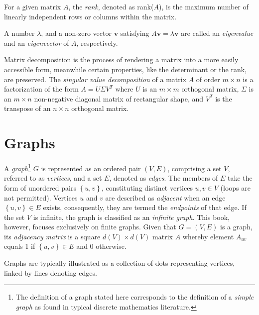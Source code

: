 For a given matrix $A$, the \emph{rank}, denoted as rank($A$), is the maximum number of linearly independent rows or columns within the matrix.

A number $\lambda$, and a non-zero vector $\mathbf{v}$ satisfying $A \mathbf{v} = \lambda \mathbf{v}$ are called an \emph{eigenvalue} and an \emph{eigenvector} of $A$, respectively.

Matrix decomposition is the process of rendering a matrix into a more easily accessible form, meanwhile certain properties, like the determinant or the rank, are preserved. The \emph{singular value decomposition} of a matrix $A$ of order $m \times n$ is a factorization of the form $A = U \Sigma V^T$ where $U$ is an $m \times m$ orthogonal matrix, $\Sigma$ is an $m \times n$ non-negative diagonal matrix of rectangular shape, and $V^T$ is the transpose of an $n \times n$ orthogonal matrix.

%
%

\section{Graphs}
\label{sec:Graphs}

A \emph{graph}\footnote{The definition of a graph stated here corresponds to the definition of a \emph{simple graph} as found in typical discrete mathematics literature.} $G$ is represented as an ordered pair $(V,E)$, comprising a set $V$, referred to as \emph{vertices}, and a set $E$, denoted as \emph{edges}. The members of $E$ take the form of unordered pairs $\left\{ u,v\right\}$, constituting distinct vertices $u,v\in V$ (loops are not permitted). Vertices $u$ and $v$ are described as \emph{adjacent} when an edge $\left\{ u,v\right\} \in E$ exists, consequently, they are termed the \emph{endpoints} of that edge. If the set $V$ is infinite, the graph is classified as an \emph{infinite graph}. This book, however, focuses exclusively on finite graphs. Given that $G = (V,E)$ is a graph, its \emph{adjacency matrix} is a square $d(V) \times d(V)$ matrix $A$ whereby element $A_{uv}$ equals 1 if $\left\{ u,v\right\} \in E$ and 0 otherwise.

Graphs are typically illustrated as a collection of dots representing vertices, linked by lines denoting edges.

